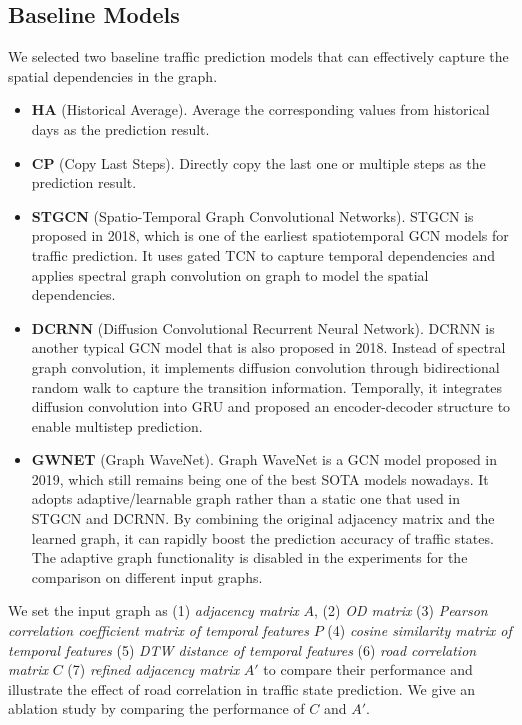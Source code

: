 \subsection{Baseline Models}
We selected two baseline traffic prediction models that can effectively capture the spatial dependencies in the graph.

\begin{itemize}
    \item \textbf{HA} (Historical Average). Average the corresponding values from historical days as the prediction result.
    \item \textbf{CP} (Copy Last Steps). Directly copy the last one or multiple steps as the prediction result.
    \item \textbf{STGCN}\cite{STGCN} (Spatio-Temporal Graph Convolutional Networks). STGCN is proposed in 2018, which is one of the earliest spatiotemporal GCN models for traffic prediction. It uses gated TCN\cite{TCN} to capture temporal dependencies and applies spectral graph convolution\cite{GCN0} on graph to model the spatial dependencies.
    \item \textbf{DCRNN}\cite{DCRNN} (Diffusion Convolutional Recurrent Neural Network). DCRNN is another typical GCN model that is also proposed in 2018. Instead of spectral graph convolution, it implements diffusion convolution through bidirectional random walk to capture the transition information. Temporally, it integrates diffusion convolution into GRU and proposed an encoder-decoder structure to enable multistep prediction.
    \item \textbf{GWNET}\cite{GWNET} (Graph WaveNet). Graph WaveNet is a GCN model proposed in 2019, which still remains being one of the best SOTA models nowadays. It adopts adaptive/learnable graph rather than a static one that used in STGCN and DCRNN. By combining the original adjacency matrix and the learned graph, it can rapidly boost the prediction accuracy of traffic states. The adaptive graph functionality is disabled in the experiments for the comparison on different input graphs.
\end{itemize}

We set the input graph as (1) \textit{adjacency matrix} $A$, (2) \textit{OD matrix} (3) \textit{Pearson correlation coefficient matrix of temporal features} $P$ (4) \textit{cosine similarity matrix of temporal features} (5) \textit{DTW distance of temporal features} (6) \textit{road correlation matrix} $C$ (7) \textit{refined adjacency matrix} $A'$ to compare their performance and illustrate the effect of road correlation in traffic state prediction. We give an ablation study by comparing the performance of $C$ and $A'$.

